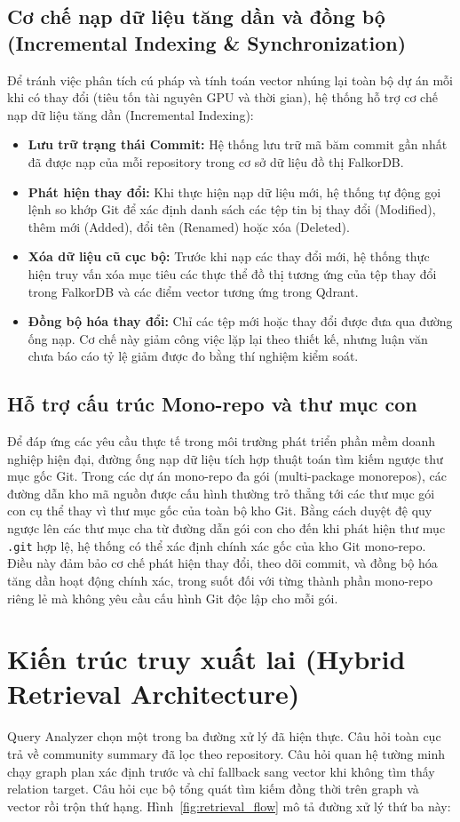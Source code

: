 \documentclass[12pt,a4paper,oneside]{report}
\begin{document}
\subsection{Cơ chế nạp dữ liệu tăng dần và đồng bộ (Incremental Indexing \& Synchronization)}
Để tránh việc phân tích cú pháp và tính toán vector nhúng lại toàn bộ dự án mỗi khi có thay đổi (tiêu tốn tài nguyên GPU và thời gian), hệ thống hỗ trợ cơ chế nạp dữ liệu tăng dần (Incremental Indexing):
\begin{itemize}
    \item \textbf{Lưu trữ trạng thái Commit:} Hệ thống lưu trữ mã băm commit gần nhất đã được nạp của mỗi repository trong cơ sở dữ liệu đồ thị FalkorDB.
    \item \textbf{Phát hiện thay đổi:} Khi thực hiện nạp dữ liệu mới, hệ thống tự động gọi lệnh so khớp Git để xác định danh sách các tệp tin bị thay đổi (Modified), thêm mới (Added), đổi tên (Renamed) hoặc xóa (Deleted).
    \item \textbf{Xóa dữ liệu cũ cục bộ:} Trước khi nạp các thay đổi mới, hệ thống thực hiện truy vấn xóa mục tiêu các thực thể đồ thị tương ứng của tệp thay đổi trong FalkorDB và các điểm vector tương ứng trong Qdrant.
    \item \textbf{Đồng bộ hóa thay đổi:} Chỉ các tệp mới hoặc thay đổi được đưa qua đường ống nạp. Cơ chế này giảm công việc lặp lại theo thiết kế, nhưng luận văn chưa báo cáo tỷ lệ giảm được đo bằng thí nghiệm kiểm soát.
\end{itemize}

\subsection{Hỗ trợ cấu trúc Mono-repo và thư mục con}
Để đáp ứng các yêu cầu thực tế trong môi trường phát triển phần mềm doanh nghiệp hiện đại, đường ống nạp dữ liệu tích hợp thuật toán tìm kiếm ngược thư mục gốc Git. Trong các dự án mono-repo đa gói (multi-package monorepos), các đường dẫn kho mã nguồn được cấu hình thường trỏ thẳng tới các thư mục gói con cụ thể thay vì thư mục gốc của toàn bộ kho Git. Bằng cách duyệt đệ quy ngược lên các thư mục cha từ đường dẫn gói con cho đến khi phát hiện thư mục \texttt{.git} hợp lệ, hệ thống có thể xác định chính xác gốc của kho Git mono-repo. Điều này đảm bảo cơ chế phát hiện thay đổi, theo dõi commit, và đồng bộ hóa tăng dần hoạt động chính xác, trong suốt đối với từng thành phần mono-repo riêng lẻ mà không yêu cầu cấu hình Git độc lập cho mỗi gói.

\section{Kiến trúc truy xuất lai (Hybrid Retrieval Architecture)}
Query Analyzer chọn một trong ba đường xử lý đã hiện thực. Câu hỏi toàn cục trả về community summary đã lọc theo repository. Câu hỏi quan hệ tường minh chạy graph plan xác định trước và chỉ fallback sang vector khi không tìm thấy relation target. Câu hỏi cục bộ tổng quát tìm kiếm đồng thời trên graph và vector rồi trộn thứ hạng. Hình~\ref{fig:retrieval_flow} mô tả đường xử lý thứ ba này:
\end{document}
